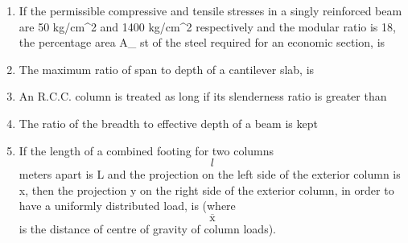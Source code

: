 \documentclass[11pt,a4paper]{article}
\begin{document}
\begin{enumerate}
\item{If the permissible compressive and tensile stresses in a singly reinforced beam are 50 kg/cm\^{}2 and 1400 kg/cm\^{}2 respectively and the modular ratio is 18, the percentage area A\_ st of the steel required for an economic section, is}
\\
\item{The maximum ratio of span to depth of a cantilever slab, is}
\\
\item{An R.C.C. column is treated as long if its slenderness ratio is greater than}
\\
\item{The ratio of the breadth to effective depth of a beam is kept}
\\
\item{If the length of a combined footing for two columns $$l$$ meters apart is L and the projection on the left side of the exterior column is x, then the projection y on the right side of the exterior column, in order to have a uniformly distributed load, is (where $$\overline {\text{x}} $$ is the distance of centre of gravity of column loads).
}
\end{enumerate}
\end{document}
